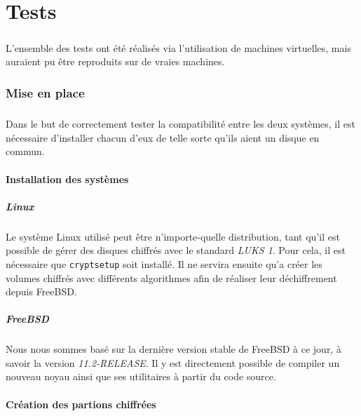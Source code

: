 \chapter{Tests}

\paragraph{}
L'ensemble des tests ont été réalisés via l'utilisation de machines virtuelles,
mais auraient pu être reproduits sur de vraies machines.

\subsection{Mise en place}

\paragraph{}
Dans le but de correctement tester la compatibilité entre les deux systèmes, il
est nécessaire d'installer chacun d'eux de telle sorte qu'ils aient un disque en
commun.

\subsubsection{Installation des systèmes}
\paragraph{Linux}
Le système Linux utilisé peut être n'importe-quelle distribution, tant qu'il est
possible de gérer des disques chiffrés avec le standard \textit{LUKS 1}. Pour
cela, il est nécessaire que \texttt{cryptsetup} soit installé. Il ne servira
ensuite qu'a créer les volumes chiffrés avec différents algorithmes afin de
réaliser leur déchiffrement depuis FreeBSD.
\paragraph{FreeBSD}
Nous nous sommes basé sur la dernière version stable de FreeBSD à ce jour, à
savoir la version \textit{11.2-RELEASE}. Il y est directement possible de
compiler un nouveau noyau ainsi que ses utilitaires à partir du code source.

\subsubsection{Création des partions chiffrées}
